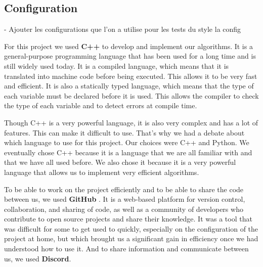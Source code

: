 \subsection{Configuration}

-  Ajouter les configurations que l'on a utilise pour les tests du style la config \newline

For this project we used \textbf{C++} to develop and implement our algorithms. 
It is a general-purpose programming language that has been used for a long time 
and is still widely used today. It is a compiled language, which means that it 
is translated into machine code before being executed. This allows it to be very 
fast and efficient. It is also a statically typed language, which means that the 
type of each variable must be declared before it is used. This allows the compiler 
to check the type of each variable and to detect errors at compile time. \newline

Though C++ is a very powerful language, it is also very complex and has a lot of
features. This can make it difficult to use. That's why we had a debate about
which language to use for this project. Our choices were C++ and Python. We
eventually chose C++ because it is a language that we are all familiar with and
that we have all used before. We also chose it because it is a very powerful
language that allows us to implement very efficient algorithms. \newline

To be able to work on the project efficiently and to be able to share the code
between us, we used \textbf{GitHub}\footnotemark 
{}.
It is a web-based platform for version control, collaboration, and sharing of
code, as well as a community of developers who contribute to open source projects
and share their knowledge. It was a tool that was difficult for some to get used
to quickly, especially on the configuration of the project at home, but which
brought us a significant gain in efficiency once we had understood how to use it.
And to share information and communicate between us, we used \textbf{Discord}.
